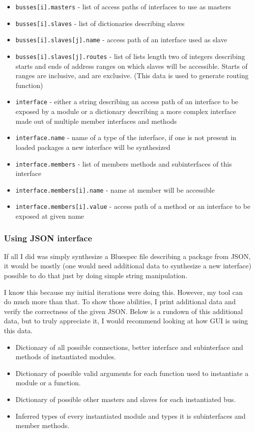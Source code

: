 \documentclass[12pt]{report}
\begin{document}
\begin{itemize}
   \item \verb!busses[i].masters! - list of access paths of interfaces to use as masters 
   \item \verb!busses[i].slaves! - list of dictionaries describing slaves 
   \item \verb!busses[i].slaves[j].name! - access path of an interface used as slave 
   \item \verb!busses[i].slaves[j].routes! - list of lists length two of integers describing starts and ends of address ranges on which slaves will be accessible. Starts of ranges are inclusive, and are exclusive. (This data is used to generate routing function) 
   \item \verb!interface! - either a string describing an access path of an interface to be exposed by a module or a dictionary describing a more complex interface made out of multiple member interfaces and methods 
   \item \verb!interface.name! - name of a type of the interface, if one is not present in loaded packages a new interface will be synthesized 
   \item \verb!interface.members! - list of members methods and subinterfaces of this interface 
   \item \verb!interface.members[i].name! - name at member will be accessible 
   \item \verb!interface.members[i].value! - access path of a method or an interface to be exposed at given name  
\end{itemize} 


\subsubsection{Using JSON interface}

If all I did was simply synthesize a Bluespec file describing a package from JSON, it would be mostly (one would need additional data to synthesize a new interface) possible to do that just by doing simple string manipulation.

I know this because my initial iterations were doing this. However, my tool can do much more than that. To show those abilities, I print additional data and verify the correctness of the given JSON. Below is a rundown of this additional data, but to truly appreciate it, I would recommend looking at how GUI is using this data.

\begin{itemize}
\item Dictionary of all possible connections, better interface and subinterface and methods of instantiated modules.
\item Dictionary of possible valid arguments for each function used to instantiate a module or a function. 
\item Dictionary of possible other masters and slaves for each instantiated bus.
\item Inferred types of every instantiated module and types it is subinterfaces and member methods.
\end{itemize} 
\end{document}
